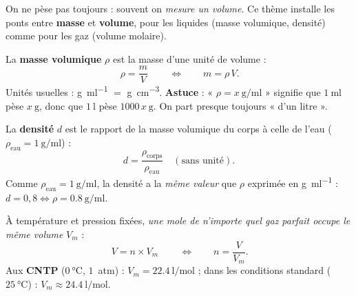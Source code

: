 \documentclass[11pt,a4paper]{article}
\begin{document}
\noindent
On ne pèse pas toujours : souvent on \emph{mesure un volume}. Ce thème installe les ponts entre
\textbf{masse} et \textbf{volume}, pour les liquides (masse volumique, densité) comme pour les gaz
(volume molaire).

\begin{cle}
La \textbf{masse volumique} $\rho$ est la masse d'une unité de volume :
\[ \boxed{\,\rho = \dfrac{m}{V}\,}\qquad\Longleftrightarrow\qquad m = \rho\,V. \]
Unités usuelles : \si{\gram\per\milli\litre} $=$ \si{\gram\per\cubic\centi\metre}. \textbf{Astuce} :
« $\rho = x\ \si{\gram\per\milli\litre}$ » signifie que $\SI{1}{\milli\litre}$ pèse $x\ \si{\gram}$,
donc que $\SI{1}{\litre}$ pèse $1000\,x\ \si{\gram}$. On part presque toujours « d'un litre ».
\end{cle}

\begin{cle}[densité $d$]
La \textbf{densité} $d$ est le rapport de la masse volumique du corps à celle de l'eau
($\rho_{\text{eau}} = \SI{1}{\gram\per\milli\litre}$) :
\[ d = \dfrac{\rho_{\text{corps}}}{\rho_{\text{eau}}}\quad(\text{sans unité}). \]
Comme $\rho_{\text{eau}} = \SI{1}{\gram\per\milli\litre}$, la densité a la \emph{même valeur} que $\rho$
exprimée en \si{\gram\per\milli\litre} : $d = 0{,}8 \Leftrightarrow \rho = \SI{0.8}{\gram\per\milli\litre}$.
\end{cle}

\begin{methode}
À température et pression fixées, \emph{une mole de n'importe quel gaz parfait occupe le même volume}
$V_m$ :
\[ \boxed{\,V = n\times V_m\,}\qquad\Longleftrightarrow\qquad n = \dfrac{V}{V_m}. \]
Aux \textbf{CNTP} ($\SI{0}{\celsius}$, $1$~atm) : $V_m = \SI{22.4}{\litre\per\mole}$ ; dans les
conditions standard ($\SI{25}{\celsius}$) : $V_m \approx \SI{24.4}{\litre\per\mole}$.
\end{methode}
\end{document}
